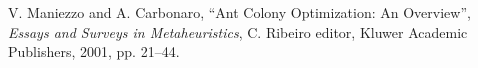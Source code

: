 \documentclass[11pt]{article}
\begin{document}
\begin{thebibliography}{99}












V. Maniezzo and A. Carbonaro,
``Ant Colony Optimization: An Overview'', {\it Essays and Surveys in
Metaheuristics}, C. Ribeiro editor, Kluwer Academic Publishers, 2001, pp.
21--44.




\end{thebibliography}
\end{document}
